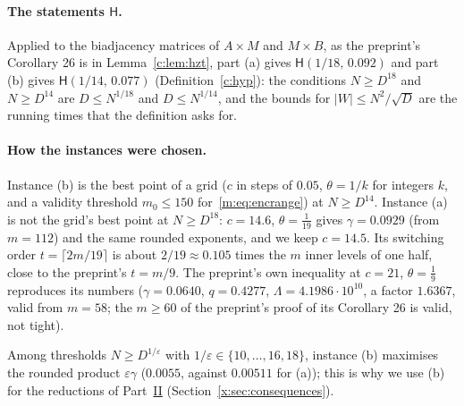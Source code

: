 \documentclass[11pt]{article}
\theoremstyle{definition}
\theoremstyle{remark}
\newcommand{\Hyp}{\mathsf{H}}
\begin{document}
\paragraph{The statements $\Hyp$.} Applied to the biadjacency matrices of $A\times M$ and $M\times B$, as the preprint's Corollary 26 is in Lemma~\ref{c:lem:hzt}, part (a) gives $\Hyp(1/18,\,0.092)$ and part (b) gives $\Hyp(1/14,\,0.077)$ (Definition~\ref{c:hyp}): the conditions $N\ge D^{18}$ and $N\ge D^{14}$ are $D\le N^{1/18}$ and $D\le N^{1/14}$, and the bounds for $|W|\le N^2/\sqrt D$ are the running times that the definition asks for.

\paragraph{How the instances were chosen.} Instance (b) is the best point of a grid ($c$ in steps of $0.05$, $\theta=1/k$ for integers $k$, and a validity threshold $m_0\le150$ for~\eqref{m:eq:encrange}) at $N\ge D^{14}$. Instance (a) is not the grid's best point at $N\ge D^{18}$: $c=14.6$, $\theta=\frac1{19}$ gives $\gamma=0.0929$ (from $m=112$) and the same rounded exponents, and we keep $c=14.5$. Its switching order $t=\lceil2m/19\rceil$ is about $2/19\approx0.105$ times the $m$ inner levels of one half, close to the preprint's $t=m/9$. The preprint's own inequality at $c=21$, $\theta=\frac19$ reproduces its numbers ($\gamma=0.0640$, $q=0.4277$, $\Lambda=4.1986\cdot10^{10}$, a factor $1.6367$, valid from $m=58$; the $m\ge60$ of the preprint's proof of its Corollary 26 is valid, not tight).

Among thresholds $N\ge D^{1/\varepsilon}$ with $1/\varepsilon\in\{10,\dots,16,18\}$, instance (b) maximises the rounded product $\varepsilon\gamma$ ($0.0055$, against $0.00511$ for (a)); this is why we use (b) for the reductions of Part~\hyperref[m:partII]{II} (Section~\ref{x:sec:consequences}).
\end{document}
